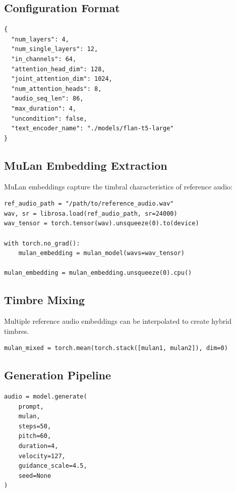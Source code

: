 \documentclass[11pt,a4paper]{article}
\begin{document}
\subsection{Configuration Format}

\begin{verbatim}
{
  "num_layers": 4,
  "num_single_layers": 12,
  "in_channels": 64,
  "attention_head_dim": 128,
  "joint_attention_dim": 1024,
  "num_attention_heads": 8,
  "audio_seq_len": 86,
  "max_duration": 4,
  "uncondition": false,
  "text_encoder_name": "./models/flan-t5-large"
}
\end{verbatim}

\subsection{MuLan Embedding Extraction}

MuLan embeddings capture the timbral characteristics of reference audio:

\begin{verbatim}
ref_audio_path = "/path/to/reference_audio.wav"
wav, sr = librosa.load(ref_audio_path, sr=24000)
wav_tensor = torch.tensor(wav).unsqueeze(0).to(device)

with torch.no_grad():
    mulan_embedding = mulan_model(wavs=wav_tensor)

mulan_embedding = mulan_embedding.unsqueeze(0).cpu()
\end{verbatim}

\subsection{Timbre Mixing}

Multiple reference audio embeddings can be interpolated to create hybrid timbres.

\begin{verbatim}
mulan_mixed = torch.mean(torch.stack([mulan1, mulan2]), dim=0)
\end{verbatim}

\subsection{Generation Pipeline}

\begin{verbatim}
audio = model.generate(
    prompt,
    mulan,
    steps=50,
    pitch=60,
    duration=4,
    velocity=127,
    guidance_scale=4.5,
    seed=None
)
\end{verbatim}
\end{document}
